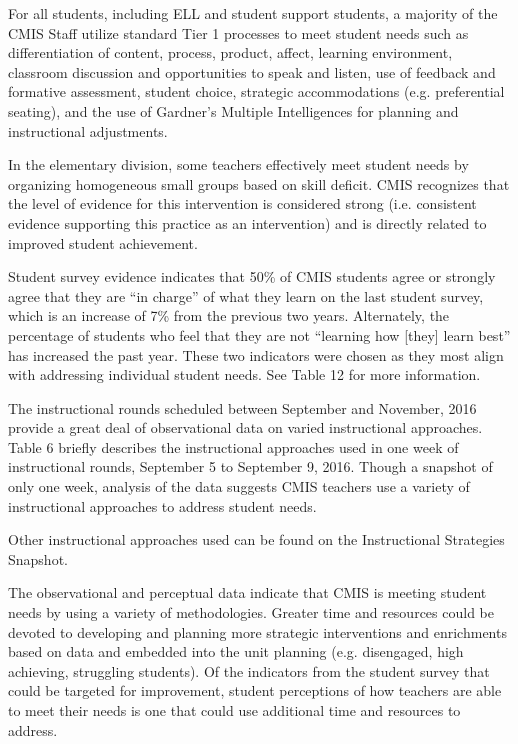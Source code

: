 \begin{findings}

For all students, including ELL and student support students, a majority of the CMIS Staff utilize standard Tier 1 processes to meet student needs such as differentiation of content, process, product, affect, learning environment, classroom discussion and opportunities to speak and listen, use of feedback and formative assessment, student choice, strategic accommodations (e.g. preferential seating), and the use of  Gardner’s Multiple Intelligences for planning and instructional adjustments. 

In the elementary division, some teachers effectively meet student needs by organizing homogeneous small groups based on skill deficit. CMIS  recognizes that the level of evidence for this intervention is considered strong (i.e. consistent evidence supporting this practice as an intervention) and is directly related to improved student achievement. 


Student survey evidence indicates that 50\% of CMIS students agree or strongly agree that they are “in charge”  of what they learn on the last student survey, which is an increase of 7\% from the previous two years. Alternately, the percentage of students who feel that they are not “learning how [they] learn best” has increased the past year. These two indicators were chosen as they most align with addressing individual student needs. See Table 12 for more information. 


The instructional rounds scheduled between September and November, 2016 provide a great deal of observational data on varied instructional approaches. Table 6 briefly describes the instructional approaches used in one week of instructional rounds, September 5 to September 9, 2016. Though a snapshot of only one week, analysis of the data suggests CMIS teachers use a variety of instructional approaches to address student needs. 

Other instructional approaches used can be found on the Instructional Strategies Snapshot. 


The observational and perceptual data indicate that CMIS is meeting student needs by using a variety of methodologies. Greater time and resources could be devoted to developing and planning more strategic interventions and enrichments based on data and embedded into the unit planning (e.g. disengaged, high achieving, struggling students). Of the indicators from the student survey that could be targeted for improvement, student perceptions of how teachers are able to meet their needs is one that could use additional time and resources to address. 
\end{findings}

